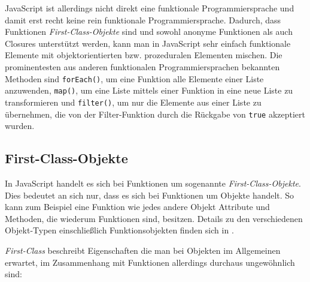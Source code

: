 \begin{description}
JavaScript ist allerdings nicht direkt eine funktionale Programmiersprache und damit erst recht
keine rein funktionale Programmiersprache. Dadurch, dass Funktionen \emph{First-Class-Objekte} sind
und sowohl anonyme Funktionen als auch Closures unterstützt werden, kann man in JavaScript sehr
einfach funktionale Elemente mit objektorientierten bzw. prozeduralen Elementen mischen. Die
prominentesten aus anderen funktionalen Programmiersprachen bekannten Methoden sind
\lstinline{forEach()}, um eine Funktion alle Elemente einer Liste anzuwenden, \lstinline{map()}, um
eine Liste mittels einer Funktion in eine neue Liste zu transformieren und \lstinline{filter()}, um
nur die Elemente aus einer Liste zu übernehmen, die von der Filter-Funktion durch die Rückgabe von
\lstinline{true} akzeptiert wurden.
\end{description}


\subsection{First-Class-Objekte}
In JavaScript handelt es sich bei Funktionen um sogenannte \emph{First-Class-Objekte}. Dies
bedeutet an sich nur, dass es sich bei Funktionen um Objekte handelt. So kann zum Beispiel eine
Funktion wie jedes andere Objekt Attribute und Methoden, die wiederum Funktionen sind, besitzen.
Details zu den verschiedenen Objekt-Typen einschließlich Funktionsobjekten finden sich in
\citep[Kap. 8.6]{ecmascript}.

\emph{First-Class} beschreibt Eigenschaften die man bei Objekten im Allgemeinen erwartet, im
Zusammenhang mit Funktionen allerdings durchaus ungewöhnlich sind:

